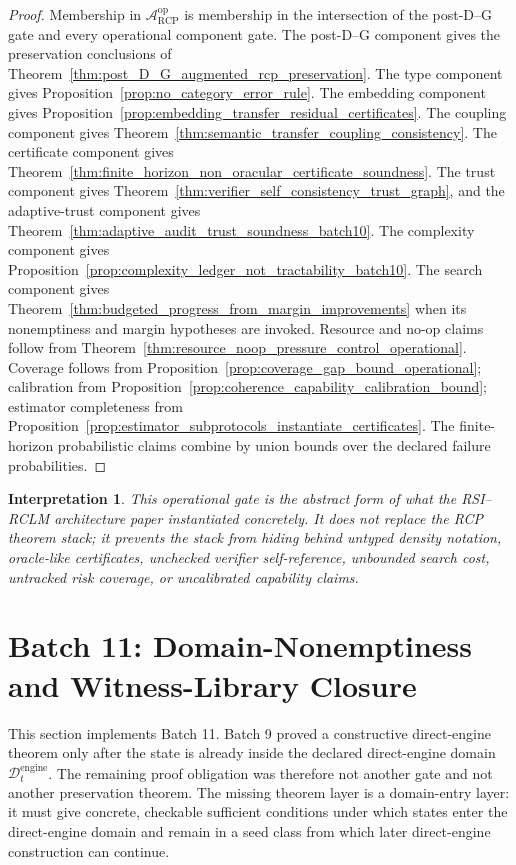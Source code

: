 \documentclass[11pt]{article}
\newtheorem{interpretation}[theorem]{Interpretation}
\newcommand{\Acal}{\mathcal{A}}
\newcommand{\1}{\mathbf{1}}
\newcommand{\RCP}{\mathrm{RCP}}
\providecommand{\Dcal}{\mathcal{D}}
\begin{document}
\begin{proof}
Membership in \(\Acal_{\RCP}^{\mathrm{op}}\) is membership in the intersection of the post-D--G gate and every operational component gate.  The post-D--G component gives the preservation conclusions of Theorem~\ref{thm:post_D_G_augmented_rcp_preservation}.  The type component gives Proposition~\ref{prop:no_category_error_rule}.  The embedding component gives Proposition~\ref{prop:embedding_transfer_residual_certificates}.  The coupling component gives Theorem~\ref{thm:semantic_transfer_coupling_consistency}.  The certificate component gives Theorem~\ref{thm:finite_horizon_non_oracular_certificate_soundness}.  The trust component gives Theorem~\ref{thm:verifier_self_consistency_trust_graph}, and the adaptive-trust component gives Theorem~\ref{thm:adaptive_audit_trust_soundness_batch10}.  The complexity component gives Proposition~\ref{prop:complexity_ledger_not_tractability_batch10}.  The search component gives Theorem~\ref{thm:budgeted_progress_from_margin_improvements} when its nonemptiness and margin hypotheses are invoked.  Resource and no-op claims follow from Theorem~\ref{thm:resource_noop_pressure_control_operational}.  Coverage follows from Proposition~\ref{prop:coverage_gap_bound_operational}; calibration from Proposition~\ref{prop:coherence_capability_calibration_bound}; estimator completeness from Proposition~\ref{prop:estimator_subprotocols_instantiate_certificates}.  The finite-horizon probabilistic claims combine by union bounds over the declared failure probabilities.
\end{proof}

\begin{interpretation}
This operational gate is the abstract form of what the RSI--RCLM architecture paper instantiated concretely.  It does not replace the RCP theorem stack; it prevents the stack from hiding behind untyped density notation, oracle-like certificates, unchecked verifier self-reference, unbounded search cost, untracked risk coverage, or uncalibrated capability claims.
\end{interpretation}



\section{Batch 11: Domain-Nonemptiness and Witness-Library Closure}
\label{sec:batch11_domain_nonemptiness_witness_library}

This section implements Batch 11.  Batch 9 proved a constructive direct-engine theorem only after the state is already inside the declared direct-engine domain \(\Dcal_t^{\mathrm{engine}}\).  The remaining proof obligation was therefore not another gate and not another preservation theorem.  The missing theorem layer is a domain-entry layer: it must give concrete, checkable sufficient conditions under which states enter the direct-engine domain and remain in a seed class from which later direct-engine construction can continue.
\end{document}
